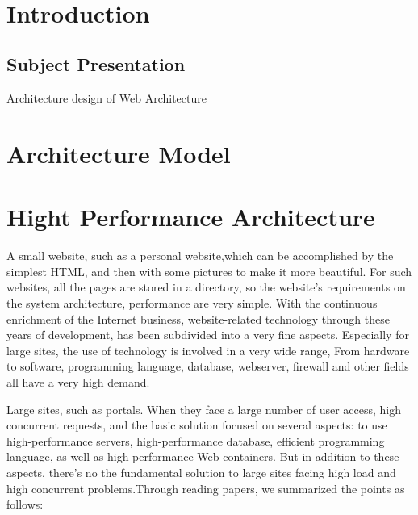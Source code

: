 \documentclass[a4paper]{article}
\title{\underline{\textbf{\begin{Huge}SA Group\end{Huge}}}\\\vspace{1cm}
    \begin{huge}
        \textbf{Assignment 1}
    \end{huge}\\}
\author{
        Tom Moulard (16920041) \textit{Long Wei}\\
        Mathis Raguin (16920040)\\
        Louis Tamagny (16920043)\\
        Will Detlor (16920031)\\
        Yuhui Zhang (14301027)\\
        \date{}
        }
\begin{document}
\maketitle
\begin{center}
\vspace{1cm}
\date{20 march 2017}
\vspace{2cm}\\
\end{center}    
    \thispagestyle{empty}

\newpage{}

\tableofcontents
\thispagestyle{empty}

\newpage
\section{Introduction}

\subsection{Subject Presentation}
Architecture design of Web Architecture

\newpage
\section{Architecture Model}

\newpage
\section{Hight Performance Architecture}
A small website, such as a personal website,which can be accomplished by the simplest HTML, and then with some pictures to make it more beautiful. For such websites, all the pages are stored in a directory, so the website’s requirements on the system architecture, performance are very simple. With the continuous enrichment of the Internet business, website-related technology through these years of development, has been subdivided into a very fine aspects. Especially for large sites, the use of technology is involved in a very wide range, From hardware to software, programming language, database, webserver, firewall and other fields all have a very high demand. 

Large sites, such as portals. When they face a large number of user access, high concurrent requests, and the basic solution focused on several aspects:  to use high-performance servers, high-performance database, efficient programming language, as well as high-performance Web containers. But in addition to these aspects, there’s no the fundamental solution to large sites facing high load and high concurrent problems.Through reading papers, we summarized the points as follows:
\end{document}
